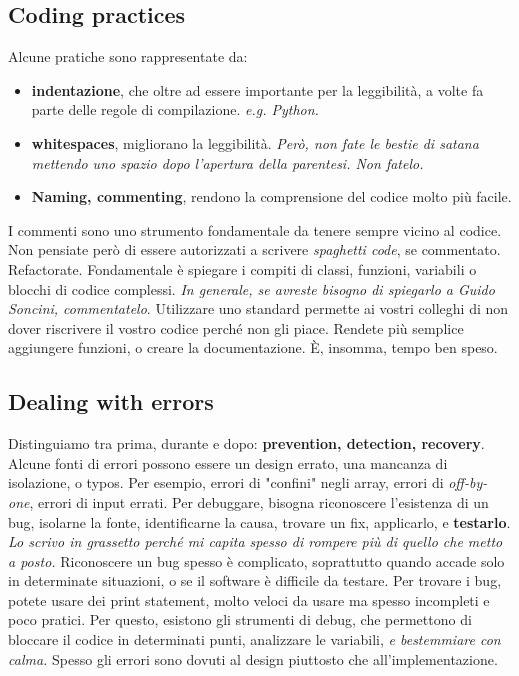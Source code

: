 \documentclass[11pt]{article}
\begin{document}
\subsection{Coding practices}
Alcune pratiche sono rappresentate da:
\begin{itemize}
    \item \textbf{indentazione}, che oltre ad essere importante per la leggibilità, a volte fa parte delle regole di compilazione. \textit{e.g. Python.}
    \item \textbf{whitespaces}, migliorano la leggibilità. \textit{Però, non fate le bestie di satana mettendo uno spazio dopo l'apertura della parentesi. Non fatelo. }
    \item \textbf{Naming, commenting}, rendono la comprensione del codice molto più facile.
\end{itemize}
I commenti sono uno strumento fondamentale da tenere sempre vicino al codice. Non pensiate però di essere autorizzati a scrivere \textit{spaghetti code}, se commentato. Refactorate. Fondamentale è spiegare i compiti di classi, funzioni, variabili o blocchi di codice complessi. \textit{In generale, se avreste bisogno di spiegarlo a Guido Soncini, commentatelo}. Utilizzare uno standard permette ai vostri colleghi di non dover riscrivere il vostro codice perché non gli piace. Rendete più semplice aggiungere funzioni, o creare la documentazione. È, insomma, tempo ben speso. 
\subsection{Dealing with errors}
Distinguiamo tra prima, durante e dopo: \textbf{prevention, detection, recovery}. Alcune fonti di errori possono essere un design errato, una mancanza di isolazione, o typos. Per esempio, errori di "confini" negli array, errori di \textit{off-by-one}, errori di input errati. Per debuggare, bisogna riconoscere l'esistenza di un bug, isolarne la fonte, identificarne la causa, trovare un fix, applicarlo, e \textbf{testarlo}. \textit{Lo scrivo in grassetto perché mi capita spesso di rompere più di quello che metto a posto.} 
Riconoscere un bug spesso è complicato, soprattutto quando accade solo in determinate situazioni, o se il software è difficile da testare. Per trovare i bug, potete usare dei print statement, molto veloci da usare ma spesso incompleti e poco pratici. Per questo, esistono gli strumenti di debug, che permettono di bloccare il codice in determinati punti, analizzare le variabili, \textit{e bestemmiare con calma.} Spesso gli errori sono dovuti al design piuttosto che all'implementazione. 
\end{document}
